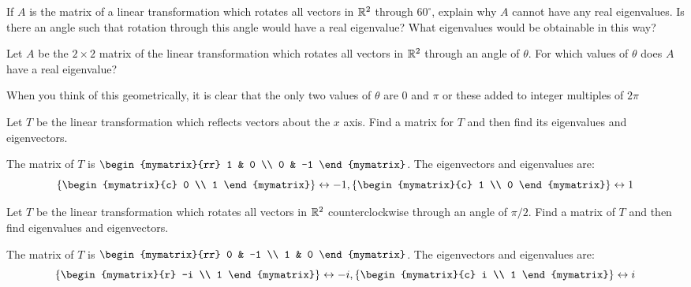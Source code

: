 \begin{enumialphparenastyle}

\begin{ex} If $A$ is the matrix of a linear transformation which rotates all
vectors in $\mathbb{R}^{2}$ through $60^{\circ }$, explain why $A$ cannot
have any real eigenvalues. Is there an angle such that rotation through this
angle would have a real eigenvalue? What eigenvalues would be obtainable in
this way? \vspace{1mm} 
\end{ex}


\begin{ex} Let $A$ be the $2\times 2$ matrix of the linear transformation which
rotates all vectors in $\mathbb{R}^{2}$ through an angle of $\theta $. For
which values of $\theta $ does $A$ have a real eigenvalue? 
\begin{sol}
When you think of this geometrically, it is clear that the only two values
of $\theta $ are 0 and $\pi $ or these added to integer multiples of $2\pi $
\end{sol}
\end{ex}


\begin{ex} Let $T$ be the linear transformation which reflects vectors about
the $x$ axis. Find a matrix for $T$ and then find its eigenvalues and
eigenvectors. 
\begin{sol}
The matrix of $T$ is $\begin{mymatrix}{rr}
1 & 0 \\
0 & -1
\end{mymatrix}$. The eigenvectors and eigenvalues are:
\[
\set{\begin{mymatrix}{c}
0 \\
1
\end{mymatrix} } \leftrightarrow -1,\set{\begin{mymatrix}{c}
1 \\
0
\end{mymatrix} } \leftrightarrow 1
\]
\end{sol}
\end{ex}

\begin{ex} Let $T$ be the linear transformation which rotates all vectors in 
$\mathbb{R}^{2}$ counterclockwise through an angle of $\pi /2$. Find a matrix
of $T$ and then find eigenvalues and eigenvectors.
\begin{sol}
The matrix of $T$ is $\begin{mymatrix}{rr}
0 & -1 \\
1 & 0
\end{mymatrix}$. The eigenvectors and eigenvalues are:
\[
\set{\begin{mymatrix}{r}
-i \\
1
\end{mymatrix} } \leftrightarrow -i,\set{\begin{mymatrix}{c}
i \\
1
\end{mymatrix} } \leftrightarrow i
\]
\end{sol}
\end{ex}


\end{enumialphparenastyle}
